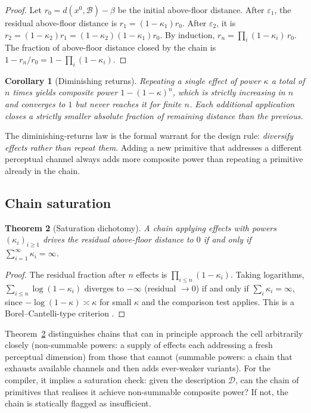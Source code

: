 \documentclass[twocolumn,11pt,a4paper]{article}
\theoremstyle{mee}
\newtheorem{theorem}{Theorem}[section]
\newtheorem{corollary}[theorem]{Corollary}
\theoremstyle{definition}
\theoremstyle{remark}
\newcommand{\BState}{\mathcal{B}}
\newcommand{\floor}{\beta}
\newcommand{\pot}{\kappa}
\newcommand{\Eff}{\varepsilon}
\newcommand{\src}{x^{0}}
\newcommand{\Desc}{\mathcal{D}}
\newcommand{\dist}{d}
\begin{document}
\begin{proof}
Let $r_0=\dist(\src,\BState)-\floor$ be the initial above-floor distance.
After $\Eff_1$, the residual above-floor distance is $r_1=(1-\pot_1)r_0$.
After $\Eff_2$, it is $r_2=(1-\pot_2)r_1=(1-\pot_2)(1-\pot_1)r_0$. By
induction, $r_n=\prod_i(1-\pot_i)\,r_0$. The fraction of above-floor
distance closed by the chain is $1-r_n/r_0=1-\prod_i(1-\pot_i)$.
\end{proof}

\begin{corollary}[Diminishing returns]
\label{cor:diminishing}
Repeating a single effect of power $\pot$ a total of $n$ times yields
composite power $1-(1-\pot)^n$, which is strictly increasing in $n$ and
converges to $1$ but never reaches it for finite $n$. Each additional
application closes a strictly smaller absolute fraction of remaining
distance than the previous.
\end{corollary}

The diminishing-returns law is the formal warrant for the design rule:
\emph{diversify effects rather than repeat them}. Adding a new primitive
that addresses a different perceptual channel always adds more composite
power than repeating a primitive already in the chain.

\subsection{Chain saturation}

\begin{theorem}[Saturation dichotomy]
\label{thm:saturation}
A chain applying effects with powers $(\pot_i)_{i\ge1}$ drives the
residual above-floor distance to $0$ if and only if
$\sum_{i=1}^{\infty}\pot_i=\infty$.
\end{theorem}

\begin{proof}
The residual fraction after $n$ effects is $\prod_{i\le n}(1-\pot_i)$.
Taking logarithms, $\sum_{i\le n}\log(1-\pot_i)$ diverges to $-\infty$
(residual $\to0$) if and only if $\sum_i\pot_i=\infty$, since
$-\log(1-\pot)\asymp\pot$ for small $\pot$ and the comparison test
applies. This is a Borel--Cantelli-type criterion
\citep{borel1909,cantelli1917}.
\end{proof}

Theorem~\ref{thm:saturation} distinguishes chains that can in principle
approach the cell arbitrarily closely (non-summable powers: a supply of
effects each addressing a fresh perceptual dimension) from those that
cannot (summable powers: a chain that exhausts available channels and
then adds ever-weaker variants). For the compiler, it implies a
saturation check: given the description $\Desc$, can the chain of
primitives that realises it achieve non-summable composite power? If not,
the chain is statically flagged as insufficient.
\end{document}
